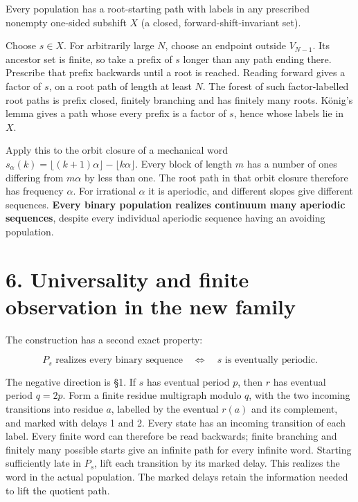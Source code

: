 \documentclass[
  11pt,
]{article}
\begin{document}
Every population has a root-starting path with labels in any prescribed
nonempty one-sided subshift \(X\) (a closed, forward-shift-invariant
set).

Choose \(s\in X\). For arbitrarily large \(N\), choose an endpoint
outside \(V_{N-1}\). Its ancestor set is finite, so take a prefix of
\(s\) longer than any path ending there. Prescribe that prefix backwards
until a root is reached. Reading forward gives a factor of \(s\), on a
root path of length at least \(N\). The forest of such factor-labelled
root paths is prefix closed, finitely branching and has finitely many
roots. König's lemma gives a path whose every prefix is a factor of
\(s\), hence whose labels lie in \(X\).

Apply this to the orbit closure of a mechanical word
\(s_\alpha(k)=\lfloor(k+1)\alpha\rfloor-\lfloor k\alpha\rfloor\). Every
block of length \(m\) has a number of ones differing from \(m\alpha\) by
less than one. The root path in that orbit closure therefore has
frequency \(\alpha\). For irrational \(\alpha\) it is aperiodic, and
different slopes give different sequences. \textbf{Every binary
population realizes continuum many aperiodic sequences}, despite every
individual aperiodic sequence having an avoiding population.

\section{6. Universality and finite observation in the new
family}\label{universality-and-finite-observation-in-the-new-family}

The construction has a second exact property:

\[P_s\text{ realizes every binary sequence}
\quad\Longleftrightarrow\quad s\text{ is eventually periodic}.\]

The negative direction is §1. If \(s\) has eventual period \(p\), then
\(r\) has eventual period \(q=2p\). Form a finite residue multigraph
modulo \(q\), with the two incoming transitions into residue \(a\),
labelled by the eventual \(r(a)\) and its complement, and marked with
delays 1 and 2. Every state has an incoming transition of each label.
Every finite word can therefore be read backwards; finite branching and
finitely many possible starts give an infinite path for every infinite
word. Starting sufficiently late in \(P_s\), lift each transition by its
marked delay. This realizes the word in the actual population. The
marked delays retain the information needed to lift the quotient path.
\end{document}
